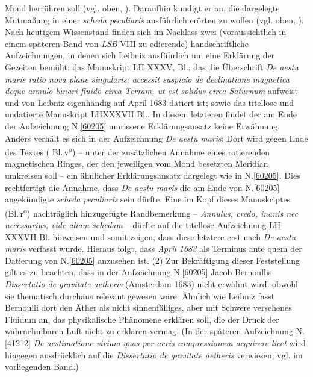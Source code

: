 Mond herrühren soll (vgl. oben, ).
Daraufhin kundigt er an, die dargelegte Mutmaßung in einer \textit{scheda peculiaris} ausführlich erörten zu wollen (vgl. oben, ).
Nach heutigem Wissenstand finden sich im Nachlass zwei (voraussichtlich in einem späteren Band von \textit{LSB} VIII zu edierende) handschriftliche Aufzeichnungen, in denen sich Leibniz ausführlich um eine Erklärung der Gezeiten bemüht:
das Manuskript LH XXXV, Bl., %
das die Überschrift
\ledpb%
\textit{De aestu maris ratio nova plane singularis; accessit suspicio de declinatione magnetica deque annulo lunari fluido circa Terram,
ut est solidus circa Saturnum} aufweist und von Leibniz eigenhändig auf April 1683 datiert ist;
sowie das titellose und undatierte Manuskript LH\;XXXVII Bl.. %
In diesem letzteren findet der am Ende der Aufzeichnung N.\;\ref{60205} umrissene Erklärungsansatz keine Erwähnung.
Anders verhält es sich in der Aufzeichnung \textit{De aestu maris}: %
Dort wird gegen Ende des Textes (%
Bl.\,v\textsuperscript{o}) -- unter der zusätzlichen Annahme eines rotierenden magnetischen Ringes, der den jeweiligen vom Mond besetzten Meridian umkreisen soll -- ein ähnlicher Erklärungsansatz dargelegt wie in N.\;\ref{60205}.
Dies rechtfertigt die Annahme, dass \textit{De aestu maris} die am Ende von N.\;\ref{60205} angekündigte \textit{scheda peculiaris} sein dürfte.
Eine im Kopf dieses Manuskriptes %
(Bl.\,r\textsuperscript{o}) nachträglich hinzugefügte Randbemerkung -- \textit{Annulus, credo, inanis nec necessarius, vide aliam schedam} -- dürfte auf die titellose Aufzeichnung LH XXXVII Bl. %
hinweisen und somit zeigen, dass diese letztere erst nach \textit{De aestu maris} verfasst wurde.
Hieraus folgt, dass \textit{April 1683} als Terminus ante quem der Datierung von N.\;\ref{60205} anzusehen ist.
\pend%
\pstart%
(2)
Zur Bekräftigung dieser Feststellung gilt es zu beachten, dass in der Aufzeichnung N.\;\ref{60205} Jacob Bernoullis \textit{Dissertatio de gravitate aetheris} (Amsterdam 1683)\cite{01403} nicht erwähnt wird, obwohl sie thematisch durchaus relevant gewesen wäre:
Ähnlich wie Leibniz fasst Bernoulli dort den Äther als nicht sinnenfälliges, aber mit Schwere versehenes Fluidum an, das physikalische Phänomene erklären soll, die der Druck der wahrnehmbaren Luft nicht zu erklären vermag.
(In der späteren Aufzeichnung N.\;\ref{41212} \textit{De aestimatione virium quas per aeris compressionem acquirere licet} wird hingegen ausdrücklich auf die \textit{Dissertatio de gravitate aetheris}\cite{01403} verwiesen; vgl.  im vorliegenden Band.)
